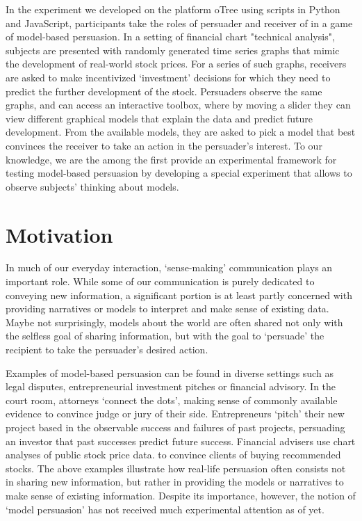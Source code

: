 \documentclass[11pt, a4paper, leqno]{article}
\begin{document}
In the experiment we developed on the platform oTree using scripts in Python and JavaScript, participants take the roles of persuader and receiver of in a game of model-based persuasion. In a setting of financial chart "technical analysis", subjects are presented with randomly generated time series graphs that mimic the development of real-world stock prices. For a series of such graphs, receivers are asked to make incentivized `investment' decisions for which they need to predict the further development of the stock. Persuaders observe the same graphs, and can access an interactive toolbox, where by moving a slider they can view different graphical models that explain the data and predict future development. From the available models, they are asked to pick a model that best convinces the receiver to take an action in the persuader's interest. To our knowledge, we are the among the first provide an experimental framework for testing model-based persuasion by developing a special experiment that allows to observe subjects' thinking about models.


\section{Motivation}

In much of our everyday interaction, `sense-making' communication plays an important role. While some of our communication is purely dedicated to conveying new information, a significant portion is at least partly concerned with providing narratives or models to interpret and make sense of existing data. Maybe not surprisingly, models about the world are often shared not only with the selfless goal of sharing information, but with the goal to `persuade' the recipient to take the persuader's desired action.

Examples of model-based persuasion can be found in diverse settings such as legal disputes, entrepreneurial investment pitches or financial advisory. In the court room, attorneys  `connect the dots', making sense of commonly available evidence to convince judge or jury of their side. Entrepreneurs `pitch' their new project based in the observable success and failures of past projects, persuading an investor that past successes predict future success. Financial advisers use chart analyses of public stock price data. to convince clients of buying recommended stocks. The above examples illustrate how real-life persuasion often consists not in sharing new information, but rather in providing the models or narratives to make sense of existing information. Despite its importance, however, the notion of `model persuasion' has not received much experimental attention as of yet. 
\end{document}
